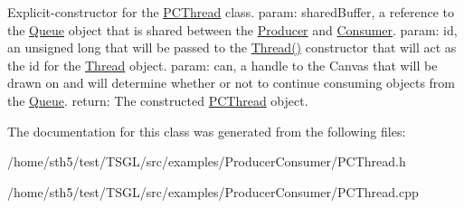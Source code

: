 Explicit-\/constructor for the \hyperlink{class_p_c_thread}{P\+C\+Thread} class. param\+: shared\+Buffer, a reference to the \hyperlink{class_queue}{Queue} object that is shared between the \hyperlink{class_producer}{Producer} and \hyperlink{class_consumer}{Consumer}. param\+: id, an unsigned long that will be passed to the \hyperlink{class_thread_a95c703fb8f2f27cb64f475a8c940864a}{Thread()} constructor that will act as the id for the \hyperlink{class_thread}{Thread} object. param\+: can, a handle to the Canvas that will be drawn on and will determine whether or not to continue consuming objects from the \hyperlink{class_queue}{Queue}. return\+: The constructed \hyperlink{class_p_c_thread}{P\+C\+Thread} object. 

The documentation for this class was generated from the following files\+:\begin{DoxyCompactItemize}
\item 
/home/sth5/test/\+T\+S\+G\+L/src/examples/\+Producer\+Consumer/P\+C\+Thread.\+h\item 
/home/sth5/test/\+T\+S\+G\+L/src/examples/\+Producer\+Consumer/P\+C\+Thread.\+cpp\end{DoxyCompactItemize}
